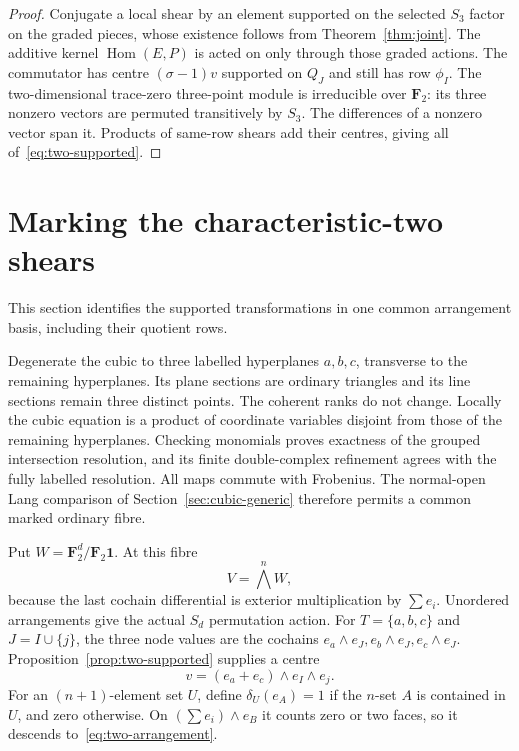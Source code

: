 \begin{proof}
Conjugate a local shear by an element supported on the selected $S_3$ factor on the graded pieces, whose existence follows from Theorem~\ref{thm:joint}. The additive kernel $\operatorname{Hom}(E,P)$ is acted on only through those graded actions. The commutator has centre $(\sigma-1)v$ supported on $Q_J$ and still has row $\phi_I$. The two-dimensional trace-zero three-point module is irreducible over $\mathbf F_2$: its three nonzero vectors are permuted transitively by $S_3$. The differences of a nonzero vector span it. Products of same-row shears add their centres, giving all of~\eqref{eq:two-supported}.
\end{proof}

\section{Marking the characteristic-two shears}\label{sec:higher-two-marking}
This section identifies the supported transformations in one common arrangement basis, including their quotient rows.

Degenerate the cubic to three labelled hyperplanes $a,b,c$, transverse to the remaining hyperplanes. Its plane sections are ordinary triangles and its line sections remain three distinct points. The coherent ranks do not change. Locally the cubic equation is a product of coordinate variables disjoint from those of the remaining hyperplanes. Checking monomials proves exactness of the grouped intersection resolution, and its finite double-complex refinement agrees with the fully labelled resolution. All maps commute with Frobenius. The normal-open Lang comparison of Section~\ref{sec:cubic-generic} therefore permits a common marked ordinary fibre.

Put $W=\mathbf F_2^d/\mathbf F_2\mathbf1$. At this fibre
\begin{equation}\label{eq:two-arrangement}
V=\bigwedge^nW,
\end{equation}
because the last cochain differential is exterior multiplication by $\sum e_i$. Unordered arrangements give the actual $S_d$ permutation action. For $T=\{a,b,c\}$ and $J=I\cup\{j\}$, the three node values are the cochains $e_a\wedge e_J,e_b\wedge e_J,e_c\wedge e_J$. Proposition~\ref{prop:two-supported} supplies a centre
\[
v=(e_a+e_c)\wedge e_I\wedge e_j.
\]
For an $(n+1)$-element set $U$, define $\delta_U(e_A)=1$ if the $n$-set $A$ is contained in $U$, and zero otherwise. On $(\sum e_i)\wedge e_B$ it counts zero or two faces, so it descends to~\eqref{eq:two-arrangement}.

